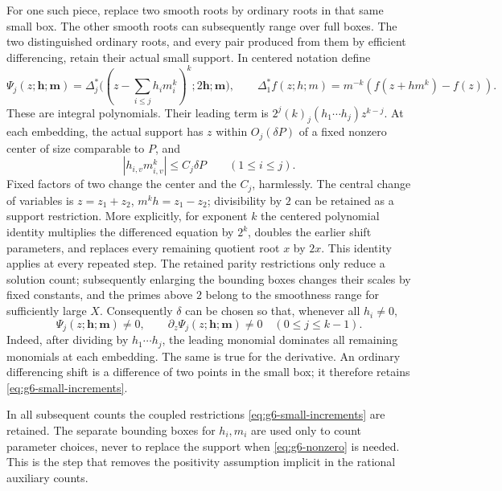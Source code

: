 \documentclass[11pt]{amsart}
\theoremstyle{definition}
\numberwithin{equation}{section}
\begin{document}
For one such piece, replace two smooth roots by ordinary roots in that same
small box.  The other smooth roots can subsequently range over full boxes.
The two distinguished ordinary roots, and every pair produced from them by
efficient differencing, retain their actual small support.
In centered notation define
\[
 \Psi_j(z;\mathbf h;\mathbf m)=
 \Delta^*_j\bigl((z-\textstyle\sum_{i\le j}h_i m_i^k)^k;
                 2\mathbf h;\mathbf m\bigr),
 \qquad
 \Delta^*_1 f(z;h;m)=m^{-k}(f(z+hm^k)-f(z)).
\]
These are integral polynomials.  Their leading term is
$2^j(k)_j(h_1\cdots h_j)z^{k-j}$.
At each embedding, the actual support has $z$ within $O_j(\delta P)$ of a
fixed nonzero center of size comparable to $P$, and
\begin{equation}\label{eq:g6-small-increments}
 |h_{i,v}m_{i,v}^k|\le C_j\delta P\qquad(1\le i\le j).
\end{equation}
Fixed factors of two change the center and the $C_j$, harmlessly.
The central change of variables is $z=z_1+z_2$,
$m^kh=z_1-z_2$; divisibility by $2$ can be retained as a support restriction.
More explicitly, for exponent $k$ the centered polynomial identity multiplies
the differenced equation by $2^k$, doubles the earlier shift parameters, and
replaces every remaining quotient root $x$ by $2x$.
This identity applies at every repeated step.
The retained parity restrictions only reduce a solution count; subsequently
enlarging the bounding boxes changes their scales by fixed constants, and the
primes above $2$ belong to the smoothness range for sufficiently large $X$.
Consequently $\delta$ can be chosen so that, whenever all $h_i\ne0$,
\begin{equation}\label{eq:g6-nonzero}
 \Psi_j(z;\mathbf h;\mathbf m)\ne0,
 \qquad \partial_z\Psi_j(z;\mathbf h;\mathbf m)\ne0
 \quad(0\le j\le k-1).
\end{equation}
Indeed, after dividing by $h_1\cdots h_j$, the leading monomial dominates
all remaining monomials at each embedding.  The same is true for the derivative.
An ordinary differencing shift is a difference of two points in the small box;
it therefore retains \eqref{eq:g6-small-increments}.

In all subsequent counts the coupled restrictions
\eqref{eq:g6-small-increments} are retained.  The separate bounding boxes for
$h_i,m_i$ are used only to count parameter choices, never to replace the support
when \eqref{eq:g6-nonzero} is needed.  This is the step that removes the
positivity assumption implicit in the rational auxiliary counts.
\end{document}
